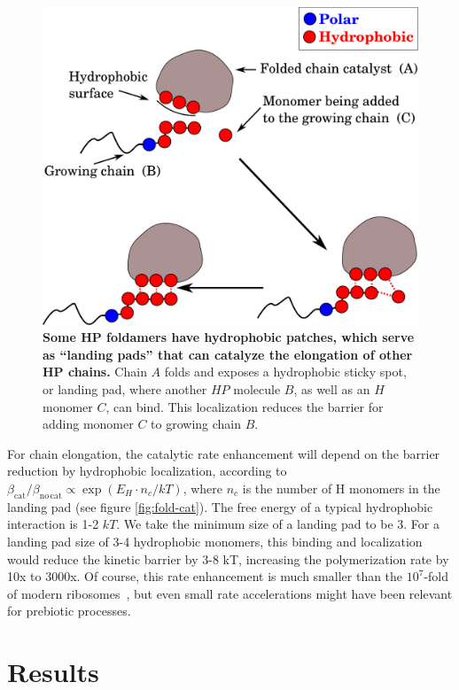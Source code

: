 \documentclass[5p,times]{elsarticle}
\begin{document}
   \begin{figure}[h!]
  \centering
  \includegraphics[width=0.8\columnwidth]{pictures/hp-catalysis.pdf} 
  \caption{\footnotesize{\textbf{Some HP foldamers have hydrophobic patches, which serve as 
``landing pads'' that can catalyze the elongation of other HP chains.}  Chain $A$ folds and 
exposes a 
hydrophobic sticky spot, or landing pad, where another $HP$ molecule $B$, as well as an $H$ monomer 
$C$, can bind.  This localization reduces the barrier for adding monomer $C$ to growing chain $B$.}}
  \label{fig:hp-catalysis}
\end{figure} 

 For chain elongation, the catalytic rate enhancement will depend on the barrier reduction by 
hydrophobic localization, according to $\beta_\mathrm{cat}/ \beta_\mathrm{no\,cat} 
\propto \exp(E_{H}\cdot n_{c}/kT)$, where $n_c$ is the number of H monomers in the 
landing pad (see figure \ref{fig:fold-cat}).  The free energy of a typical hydrophobic interaction 
is 1-2 $kT$.  We take the minimum size of a landing pad to be 3.  For a landing pad size of 3-4 
hydrophobic monomers, this binding and localization would reduce the kinetic barrier by 3-8 kT, 
increasing the polymerization rate by 10x to 3000x.  Of course, this rate enhancement is much 
smaller than the $10^7$-fold of modern ribosomes~\cite{Sievers2004a}, but even small rate 
accelerations might have been relevant for prebiotic processes.
  
\section{Results}
\end{document}
